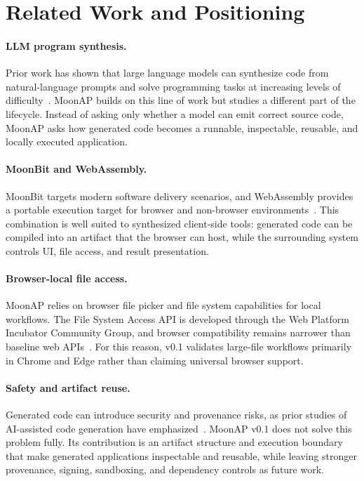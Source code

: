 \documentclass[11pt]{article}
\newcommand{\moonap}{MoonAP}
\newcommand{\wasm}{WebAssembly}
\begin{document}
\section{Related Work and Positioning}

\paragraph{LLM program synthesis.}
Prior work has shown that large language models can synthesize code from natural-language prompts and solve programming tasks at increasing levels of difficulty~\cite{chen2021evaluating,austin2021program,li2022competition}. \moonap{} builds on this line of work but studies a different part of the lifecycle. Instead of asking only whether a model can emit correct source code, \moonap{} asks how generated code becomes a runnable, inspectable, reusable, and locally executed application.

\paragraph{MoonBit and \wasm{}.}
MoonBit targets modern software delivery scenarios, and \wasm{} provides a portable execution target for browser and non-browser environments~\cite{moonbit,webassembly}. This combination is well suited to synthesized client-side tools: generated code can be compiled into an artifact that the browser can host, while the surrounding system controls UI, file access, and result presentation.

\paragraph{Browser-local file access.}
\moonap{} relies on browser file picker and file system capabilities for local workflows. The File System Access API is developed through the Web Platform Incubator Community Group, and browser compatibility remains narrower than baseline web APIs~\cite{file-system-access,mdn-file-system-access}. For this reason, v0.1 validates large-file workflows primarily in Chrome and Edge rather than claiming universal browser support.

\paragraph{Safety and artifact reuse.}
Generated code can introduce security and provenance risks, as prior studies of AI-assisted code generation have emphasized~\cite{pearce2022asleep}. \moonap{} v0.1 does not solve this problem fully. Its contribution is an artifact structure and execution boundary that make generated applications inspectable and reusable, while leaving stronger provenance, signing, sandboxing, and dependency controls as future work.
\end{document}
